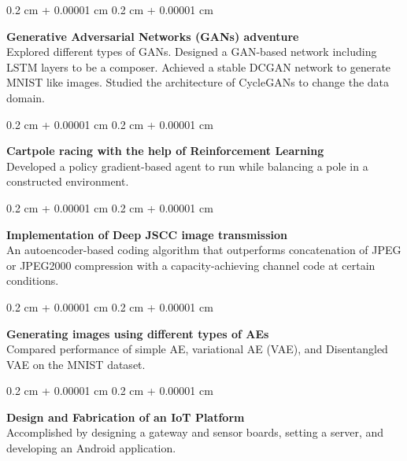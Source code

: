 \documentclass[10pt, letterpaper]{article}
\newenvironment{onecolentry}{
    \begin{adjustwidth}{
        0.2 cm + 0.00001 cm
    }{
        0.2 cm + 0.00001 cm
    }
}{
    \end{adjustwidth}
} %
\begin{document}
        \vspace{0.2 cm}

        
        \begin{onecolentry}
            \textbf{Generative Adversarial Networks (GANs) adventure}\\
            Explored different types of GANs. Designed a GAN-based network including LSTM layers to be a composer. Achieved a stable DCGAN network to generate MNIST like images. Studied the architecture of CycleGANs to change the data domain.
        \end{onecolentry}


        \vspace{0.2 cm}

        
        \begin{onecolentry}
            \textbf{Cartpole racing with the help of Reinforcement Learning}\\
            Developed a policy gradient-based agent to run while balancing a pole in a constructed environment.
        \end{onecolentry}


        \vspace{0.2 cm}

        
        \begin{onecolentry}
            \textbf{Implementation of Deep JSCC image transmission}\\
            An autoencoder-based coding algorithm that outperforms concatenation of JPEG or JPEG2000 compression with a capacity-achieving channel code at certain conditions.
        \end{onecolentry}


        \vspace{0.2 cm}

        
        \begin{onecolentry}
            \textbf{Generating images using different types of AEs}\\
            Compared performance of simple AE, variational AE (VAE), and Disentangled VAE on the MNIST dataset.
        \end{onecolentry}


        \vspace{0.2 cm}

        
        \begin{onecolentry}
            \textbf{Design and Fabrication of an IoT Platform}\\
            Accomplished by designing a gateway and sensor boards, setting a server, and developing an Android application.
        \end{onecolentry}
\end{document}
